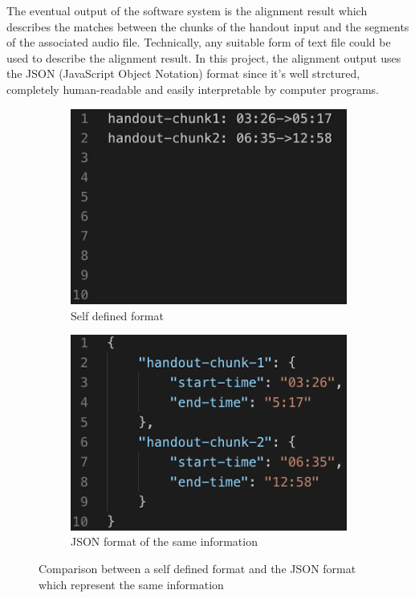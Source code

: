 The eventual output of the software system is the alignment result which describes the matches between the chunks of the handout input and the segments of the associated audio file. Technically, any suitable form of text file could be used to describe the alignment result. In this project, the alignment output uses the JSON (JavaScript Object Notation) format since it's well strctured, completely human-readable and easily interpretable by computer programs.

\begin{figure}[!htb]
  \centering
  \begin{subfigure}{.45\textwidth}
    \includegraphics[width=\textwidth]{txt-example.png}
    \caption{Self defined format}
  \end{subfigure}
  \begin{subfigure}{.45\textwidth}
    \includegraphics[width=\textwidth]{json-example.png}
    \caption{JSON format of the same information}
  \end{subfigure}
  \caption{Comparison between a self defined format and the JSON format which represent the same information}
  \label{fig:txt-json-compare}
\end{figure}

